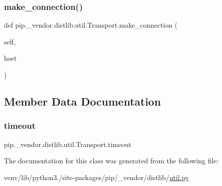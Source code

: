 \subsubsection{\texorpdfstring{make\+\_\+connection()}{make\_connection()}}
{\footnotesize\ttfamily def pip.\+\_\+vendor.\+distlib.\+util.\+Transport.\+make\+\_\+connection (\begin{DoxyParamCaption}\item[{}]{self,  }\item[{}]{host }\end{DoxyParamCaption})}



\subsection{Member Data Documentation}
\mbox{\label{classpip_1_1__vendor_1_1distlib_1_1util_1_1Transport_aa8e0d6a58347c3af195b85a75366d864}} 
\subsubsection{\texorpdfstring{timeout}{timeout}}
{\footnotesize\ttfamily pip.\+\_\+vendor.\+distlib.\+util.\+Transport.\+timeout}



The documentation for this class was generated from the following file\+:\begin{DoxyCompactItemize}
\item 
venv/lib/python3./site-\/packages/pip/\+\_\+vendor/distlib/\hyperlink{pip_2__vendor_2distlib_2util_8py}{util.\+py}\end{DoxyCompactItemize}
